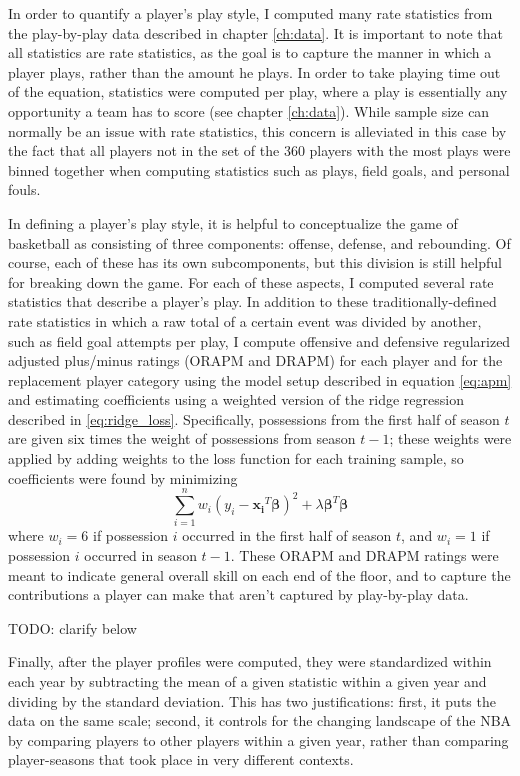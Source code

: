 In order to quantify a player's play style, I computed many rate statistics from the
play-by-play data described in chapter \ref{ch:data}. It is important to note that
all statistics are rate statistics, as the goal is to capture the manner in which a
player plays, rather than the amount he plays. In order to take playing time out of
the equation, statistics were computed per play, where a play is essentially any
opportunity a team has to score (see chapter \ref{ch:data}). While sample size can
normally be an issue with rate statistics, this concern is alleviated in this case
by the fact that all players not in the set of the 360 players with the most plays
were binned together when computing statistics such as plays, field goals, and
personal fouls.

In defining a player's play style, it is helpful to conceptualize the game of
basketball as consisting of three components: offense, defense, and rebounding.  Of
course, each of these has its own subcomponents, but this division is still helpful
for breaking down the game. For each of these aspects, I computed several rate
statistics that describe a player's play. In addition to these traditionally-defined
rate statistics in which a raw total of a certain event was divided by another, such
as field goal attempts per play, I compute offensive and defensive regularized
adjusted plus/minus ratings (ORAPM and DRAPM) for each player and for the
replacement player category using the model setup described in equation \ref{eq:apm}
and estimating coefficients using a weighted version of the ridge regression
described in \ref{eq:ridge_loss}. Specifically, possessions from the first half of
season $t$ are given six times the weight of possessions from season $t-1$; these
weights were applied by adding weights to the loss function for each training
sample, so coefficients were found by minimizing
\begin{equation} \label{eq:weighted_ridge_loss}
    \sum_{i=1}^n w_i \left( y_i - \bm{x_i}^T\bm{\beta} \right)^2 + \lambda
    \bm{\beta}^T\bm{\beta}
\end{equation}
where $w_i = 6$ if possession $i$ occurred in the first half of season $t$, and
$w_i = 1$ if possession $i$ occurred in season $t-1$. These ORAPM and DRAPM ratings
were meant to indicate general overall skill on each end of the floor, and to
capture the contributions a player can make that aren't captured by play-by-play
data.

TODO: clarify below

Finally, after the player profiles were computed, they were standardized within each
year by subtracting the mean of a given statistic within a given year and dividing
by the standard deviation. This has two justifications: first, it puts the data on
the same scale; second, it controls for the changing landscape of the NBA by
comparing players to other players within a given year, rather than comparing
player-seasons that took place in very different contexts.

